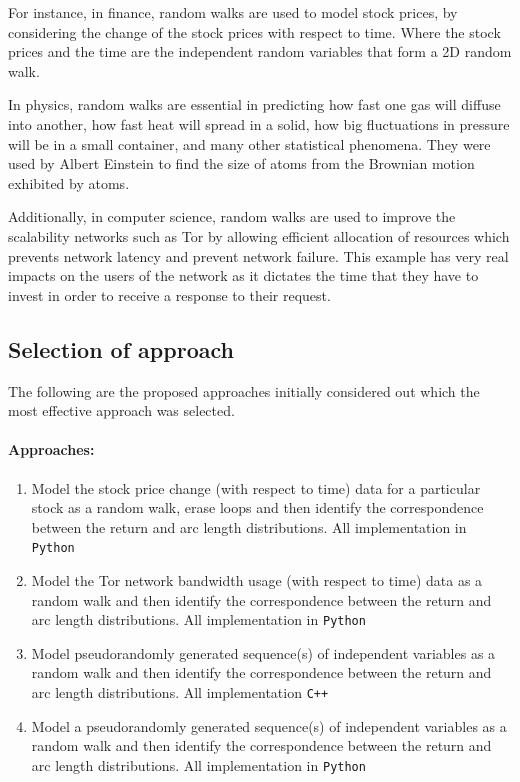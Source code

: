 \documentclass{article}
\begin{document}
For instance, in finance, random walks are used to model stock prices, by considering the change of the stock prices with respect to time. Where the stock prices and the time are the independent random variables that form a 2D random walk.

In physics, random walks are essential in predicting how fast one gas will diffuse into another, how fast heat will spread in a solid, how big fluctuations in pressure will be in a small container, and many other statistical phenomena. They were used by Albert Einstein to find the size of atoms from the Brownian motion exhibited by atoms.

Additionally, in computer science, random walks are used to improve the scalability networks such as Tor \cite{dollapplications} by allowing efficient allocation of resources which prevents network latency and prevent network failure. This example has very real impacts on the users of the network as it dictates the time that they have to invest in order to receive a response to their request.

\subsection{Selection of approach}
The following are the proposed approaches initially considered out which the most effective approach was selected.

\paragraph{Approaches:}
\begin{enumerate}
	\item{Model the stock price change (with respect to time) data for a particular stock as a random walk, erase loops and then identify the correspondence between the return and arc length distributions. All implementation in \texttt{Python}}
	\item{Model the Tor network bandwidth usage (with respect to time) data as a random walk and then identify the correspondence between the return and arc length distributions. All implementation in \texttt{Python}}
	\item{Model pseudorandomly generated sequence(s) of independent variables as a random walk and then identify the correspondence between the return and arc length distributions. All implementation \texttt{C++}}
	\item{Model a pseudorandomly generated sequence(s) of independent variables as a random walk and then identify the correspondence between the return and arc length distributions. All implementation in \texttt{Python}}
\end{enumerate}
\end{document}
